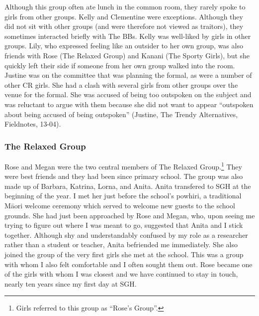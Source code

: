 \largerpage[-1] %
Although this group often ate lunch in the common room, they rarely spoke to girls from other groups. Kelly and Clementine were exceptions. Although they did not sit with other groups (and were therefore not viewed as traitors), they sometimes interacted briefly with The BBs. Kelly was well-liked by girls in other groups. Lily, who expressed feeling like an outsider to her own group, was also friends with Rose (The Relaxed Group) and Kanani (The Sporty Girls), but she quickly left their side if someone from her own group walked into the room. Justine was on the committee that was planning the formal, as were a number of other CR girls. She had a clash with several girls from other groups over the venue for the formal. She was accused of being too outspoken on the subject and was reluctant to argue with them because she did not want to appear ``outspoken about being accused of being outspoken'' (Justine, The Trendy Alternatives, Fieldnotes, 13-04).


\subsubsection{The Relaxed Group}\label{relaxedgroup}

Rose and Megan were the two central members of The Relaxed Group.\footnote{Girls referred to this group as ``Rose's Group''.}  They were best friends and they had been since primary school. The group was also made up of Barbara, Katrina, Lorna, and Anita. Anita transfered to SGH at the beginning of the year. I met her just before the school's powhiri, a traditional M\=aori welcome ceremony which served to welcome new guests to the school grounds. She had just been approached by Rose and Megan, who, upon seeing me trying to figure out where I was meant to go, suggested that Anita and I stick together. Although shy and understandably confused by my role as a researcher rather than a student or teacher, Anita befriended me immediately. She also joined the group of the very first girls she met at the school. This was a group with whom I also felt comfortable and I often sought them out. Rose became one of the girls with whom I was closest and we have continued to stay in touch, nearly ten years since my first day at SGH.

